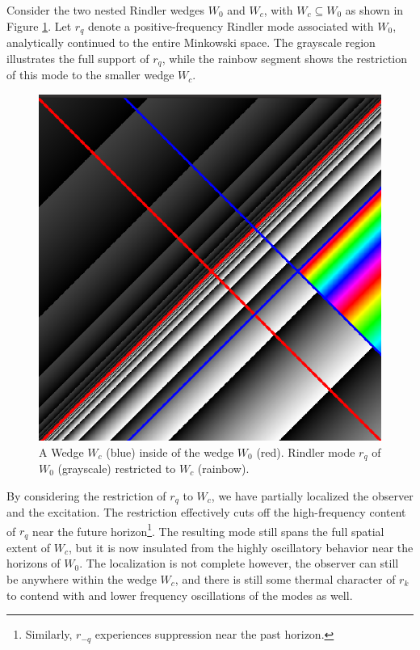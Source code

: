 \documentclass[12pt,a4paper]{article}
\begin{document}
Consider the two nested Rindler wedges $W_0$ and $W_c$, with $W_c \subseteq W_0$ as shown in Figure \ref{restrict}. Let $r_q$ denote a positive-frequency Rindler mode associated with $W_0$, analytically continued to the entire Minkowski space. The grayscale region illustrates the full support of $r_q$, while the rainbow segment shows the restriction of this mode to the smaller wedge $W_c$.

\begin{figure}[h]
  \centering
\includegraphics[scale=0.3]{wedge_in_wedge.png}
\caption{A Wedge $W_c$ (blue) inside of the wedge $W_0$ (red). Rindler mode $r_q$ of $W_0$ (grayscale) restricted to $W_c$ (rainbow).}
\label{restrict}
\end{figure}

By considering the restriction of $r_q$ to $W_c$, we have partially localized the observer and the excitation. The restriction effectively cuts off the high-frequency content of $r_q$ near the future horizon\footnote{Similarly, $r_{-q}$ experiences suppression near the past horizon.}. The resulting mode still spans the full spatial extent of $W_c$, but it is now insulated from the highly oscillatory behavior near the horizons of $W_0$.  The localization is not complete however, the observer can still be anywhere within the wedge $W_c$, and there is still some thermal character of $r_k$ to contend with and lower frequency oscillations of the modes as well.
\end{document}
